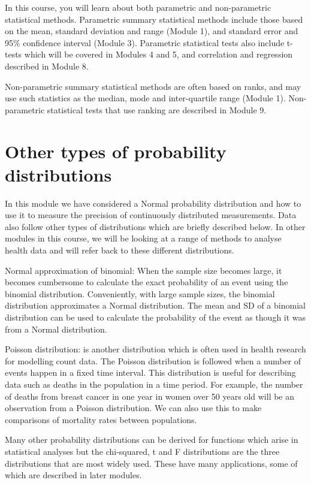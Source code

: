 \documentclass[
  a4paper,
]{memoir}
\begin{document}
In this course, you will learn about both parametric and non-parametric
statistical methods. Parametric summary statistical methods include
those based on the mean, standard deviation and range (Module 1), and
standard error and 95\% confidence interval (Module 3). Parametric
statistical tests also include t-tests which will be covered in Modules
4 and 5, and correlation and regression described in Module 8.

Non-parametric summary statistical methods are often based on ranks, and
may use such statistics as the median, mode and inter-quartile range
(Module 1). Non-parametric statistical tests that use ranking are
described in Module 9.

\section{Other types of probability
distributions}\label{other-types-of-probability-distributions}

In this module we have considered a Normal probability distribution and
how to use it to measure the precision of continuously distributed
measurements. Data also follow other types of distributions which are
briefly described below. In other modules in this course, we will be
looking at a range of methods to analyse health data and will refer back
to these different distributions.

Normal approximation of binomial: When the sample size becomes large, it
becomes cumbersome to calculate the exact probability of an event using
the binomial distribution. Conveniently, with large sample sizes, the
binomial distribution approximates a Normal distribution. The mean and
SD of a binomial distribution can be used to calculate the probability
of the event as though it was from a Normal distribution.

Poisson distribution: is another distribution which is often used in
health research for modelling count data. The Poisson distribution is
followed when a number of events happen in a fixed time interval. This
distribution is useful for describing data such as deaths in the
population in a time period. For example, the number of deaths from
breast cancer in one year in women over 50 years old will be an
observation from a Poisson distribution. We can also use this to make
comparisons of mortality rates between populations.

Many other probability distributions can be derived for functions which
arise in statistical analyses but the chi-squared, t and F distributions
are the three distributions that are most widely used. These have many
applications, some of which are described in later modules.
\end{document}
